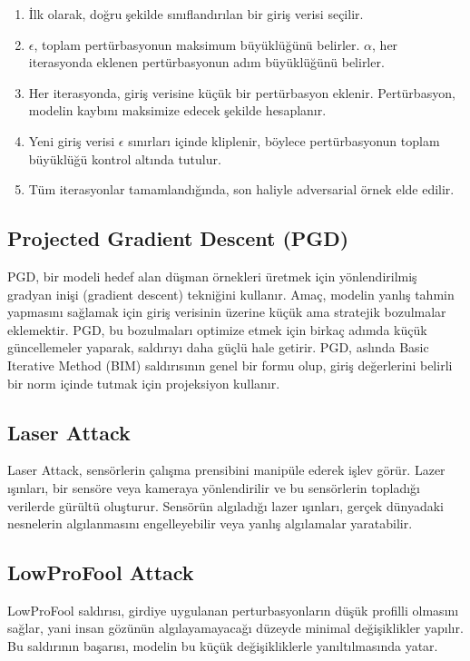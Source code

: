 \begin{enumerate}
    \item İlk olarak, doğru şekilde sınıflandırılan bir giriş verisi seçilir.
    \item $\epsilon$, toplam pertürbasyonun maksimum büyüklüğünü belirler. $\alpha$, her iterasyonda eklenen pertürbasyonun adım büyüklüğünü belirler.
    \item Her iterasyonda, giriş verisine küçük bir pertürbasyon eklenir. Pertürbasyon, modelin kaybını maksimize edecek şekilde hesaplanır.
    \item Yeni giriş verisi $\epsilon$ sınırları içinde kliplenir, böylece pertürbasyonun toplam büyüklüğü kontrol altında tutulur.
    \item Tüm iterasyonlar tamamlandığında, son haliyle adversarial örnek elde edilir.
\end{enumerate}

\newpage

\subsection{Projected Gradient Descent (PGD)}

PGD, bir modeli hedef alan düşman örnekleri üretmek için yönlendirilmiş gradyan inişi (gradient descent) tekniğini kullanır. Amaç, modelin yanlış tahmin yapmasını sağlamak için giriş verisinin üzerine küçük ama stratejik bozulmalar eklemektir. PGD, bu bozulmaları optimize etmek için birkaç adımda küçük güncellemeler yaparak, saldırıyı daha güçlü hale getirir. PGD, aslında Basic Iterative Method (BIM) saldırısının genel bir formu olup, giriş değerlerini belirli bir norm içinde tutmak için projeksiyon kullanır.

\newpage

\subsection{Laser Attack}

Laser Attack, sensörlerin çalışma prensibini manipüle ederek işlev görür. Lazer ışınları, bir sensöre veya kameraya yönlendirilir ve bu sensörlerin topladığı verilerde gürültü oluşturur. Sensörün algıladığı lazer ışınları, gerçek dünyadaki nesnelerin algılanmasını engelleyebilir veya yanlış algılamalar yaratabilir.

\newpage

\subsection{LowProFool Attack}

LowProFool saldırısı, girdiye uygulanan perturbasyonların düşük profilli olmasını sağlar, yani insan gözünün algılayamayacağı düzeyde minimal değişiklikler yapılır. Bu saldırının başarısı, modelin bu küçük değişikliklerle yanıltılmasında yatar.

\newpage